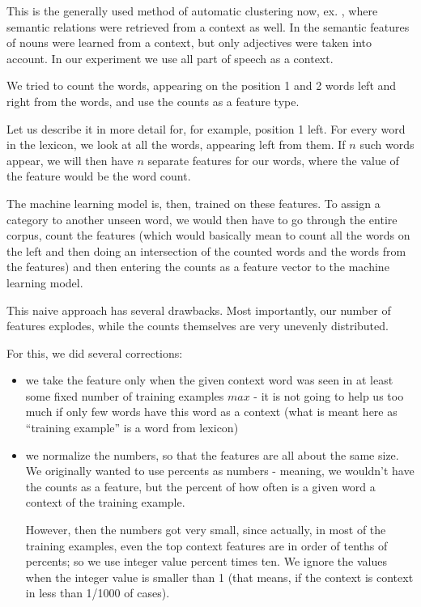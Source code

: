\documentclass[letterpaper]{article}
\begin{document}
This is  the generally used method of automatic clustering now, ex. \cite{baroni:2009},
where semantic relations were retrieved from a context as well. 
In \cite{biemann05} the semantic features of nouns were learned
from a context, but only adjectives were taken into account.
In our experiment we use all part of speech as a context. 

We tried to count the words, appearing on the position 1 and 2 words left and 
right from the words, and use the counts as a feature type. 

Let us describe it in more detail for, for example,  position 1 left. For every word in the lexicon, we 
look at all the words, appearing left from them. If $n$ such words appear, we will then have $n$ separate 
features for our words, where the value of the feature would be the word count.
 
The machine learning model is, then, trained on these features. To assign a category
to another unseen word, we would then have to go through the entire corpus, count
the features (which would basically mean to count all the words on the left and then doing an 
intersection of the counted words and the words from the features) and then entering the 
counts as a feature vector to the machine learning model.

This naive approach has several drawbacks. Most importantly, our number of features explodes, while the counts themselves are very unevenly distributed.

For this, we did several corrections:
\begin{itemize}
    \item we take the feature only when the given context word was seen in at least some 
fixed number of training examples $max$ - it is not going to help us too much 
if only few words have this word as a context (what is meant here 
as ``training example'' is a word from lexicon)
    
    \item we normalize the numbers, so that the features are all about 
the same size. We originally wanted to use percents as numbers - meaning, 
we wouldn't have the counts as a feature, but the percent of how often is a given word a context of the training example.
    
     However, then the numbers got very small, since actually, 
in most of the training examples, even the top context features are in order of 
tenths of percents; so we use integer value percent times ten. 
We ignore the values when the integer value is smaller than 1 (that means, if the context is context in less than 1/1000 of cases).
     

\end{itemize}
\end{document}
